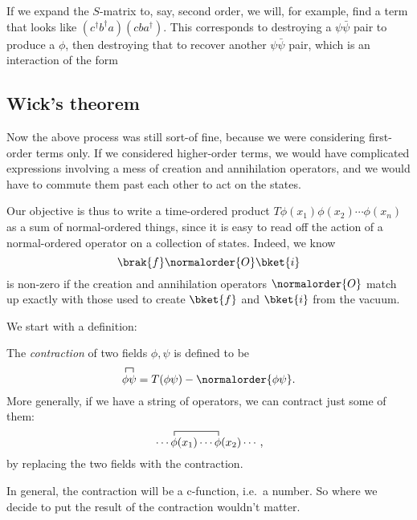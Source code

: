 \documentclass[a4paper]{article}
\begin{document}
If we expand the $S$-matrix to, say, second order, we will, for example, find a term that looks like $(c^\dagger b^\dagger a)(cba^\dagger)$. This corresponds to destroying a $\psi \bar{\psi}$ pair to produce a $\phi$, then destroying that to recover another $\psi \bar\psi$ pair, which is an interaction of the form
\begin{center}
\end{center}

\subsection{Wick's theorem}
Now the above process was still sort-of fine, because we were considering first-order terms only. If we considered higher-order terms, we would have complicated expressions involving a mess of creation and annihilation operators, and we would have to commute them past each other to act on the states.

Our objective is thus to write a time-ordered product $T \phi(x_1) \phi(x_2) \cdots \phi(x_n)$ as a sum of normal-ordered things, since it is easy to read off the action of a normal-ordered operator on a collection of states. Indeed, we know
\[
  \brak{f}\normalorder{O}\bket{i}
\]
is non-zero if the creation and annihilation operators $\normalorder{O}$ match up exactly with those used to create $\bket{f}$ and $\bket{i}$ from the vacuum.

We start with a definition:
\begin{defi}[Contraction]
  The \emph{contraction} of two fields $\phi, \psi$ is defined to be
  \[
    \contraction{}{\phi}{}{\psi}\phi\psi = T(\phi\psi) - \normalorder{\phi\psi}.
  \]
  More generally, if we have a string of operators, we can contract just some of them:
  \[
    \contraction{\cdots}{\phi}{(x_1) \cdots}{\phi}\cdots\phi(x_1) \cdots \phi(x_2) \cdots,
  \]
  by replacing the two fields with the contraction.

  In general, the contraction will be a c-function, i.e.\ a number. So where we decide to put the result of the contraction wouldn't matter.
\end{defi}
\end{document}
